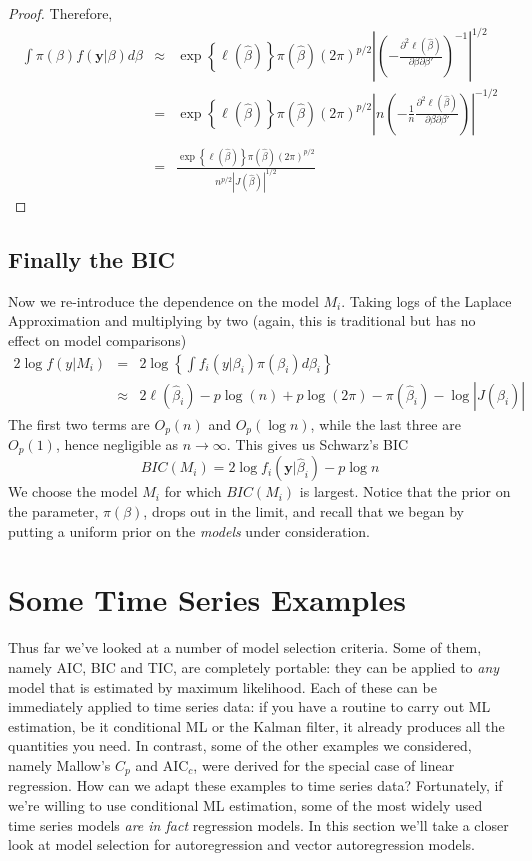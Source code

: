 \begin{proof}
Therefore,
	\begin{eqnarray*}
		\int \pi(\beta)f(\mathbf{y}|\beta)d\beta &\approx& \exp\left\{ \ell(\hat{\beta}) \right\}\pi(\hat{\beta}) \left(2\pi\right)^{p/2}\left| \left(-\frac{\partial^2 \ell(\hat{\beta})}{\partial \beta \partial \beta'}\right)^{-1} \right|^{1/2}\\
		&=&  \exp\left\{ \ell(\hat{\beta}) \right\}\pi(\hat{\beta}) \left(2\pi\right)^{p/2}\left|n \left(-\frac{1}{n}\frac{\partial^2 \ell(\hat{\beta})}{\partial \beta \partial \beta'}\right) \right|^{-1/2}\\\\
		&=&\frac{ \exp\left\{ \ell(\hat{\beta}) \right\}\pi(\hat{\beta}) \left(2\pi\right)^{p/2}}{n^{p/2}\left| J(\hat{\beta}) \right|^{1/2}}
	\end{eqnarray*}
\end{proof}


\subsection{Finally the BIC}
Now we re-introduce the dependence on the model $M_i$. Taking logs of the Laplace Approximation and multiplying by two (again, this is traditional but has no effect on model comparisons)
	\begin{eqnarray*}
		2 \log f(y|M_i) &=& 2 \log \left\{ \int f_i(y|\beta_i)\pi(\beta_i)d\beta_i \right\}\\
		&\approx& 2\ell(\hat{\beta}_i) -p\log(n) + p \log(2\pi)- \pi(\hat{\beta}_i)-\log \left| J(\hat{\beta_i}) \right|
	\end{eqnarray*}
The first two terms are $O_p(n)$ and $O_p(\log{n})$, while the last three are $O_p(1)$, hence negligible as $n\rightarrow \infty$. This gives us Schwarz's BIC
	$$BIC(M_i) = 2\log{f_i(\mathbf{y}|\hat{\beta}_i)} - p\log{n}$$
We choose the model $M_i$ for which $BIC(M_i)$ is largest. Notice that the prior on the parameter, $\pi(\beta)$, drops out in the limit, and recall that we began by putting a uniform prior on the \emph{models} under consideration. 

\section{Some Time Series Examples}
Thus far we've looked at a number of model selection criteria. 
Some of them, namely AIC, BIC and TIC, are completely portable: they can be applied to \emph{any} model that is estimated by maximum likelihood. 
Each of these can be immediately applied to time series data: if you have a routine to carry out ML estimation, be it conditional ML or the Kalman filter, it already produces all the quantities you need. 
In contrast, some of the other examples we considered, namely Mallow's $C_p$ and AIC$_c$, were derived for the special case of linear regression. 
How can we adapt these examples to time series data? Fortunately, if we're willing to use conditional ML estimation, some of the most widely used time series models \emph{are in fact} regression models. In this section we'll take a closer look at model selection for autoregression and vector autoregression models.



